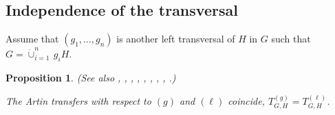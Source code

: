 \documentclass{amsart}
\newtheorem{proposition}{Proposition}[section]
\theoremstyle{definition}
\numberwithin{equation}{section}
\begin{document}
\subsection{Independence of the transversal}
\label{ss:Independence}

Assume that \((g_1,\ldots,g_n)\) is another left transversal of \(H\) in \(G\)
such that \(G=\dot{\cup}_{i=1}^n\,g_iH\).


\begin{proposition}
\label{prp:LeftLeft}
(See also
\cite[p.1014]{Su},
\cite[Thm.14.2.1, p.202]{Hl},
\cite[Hilfssatz 1.5, p.414]{Hp},
\cite[Thm.3.2, p.246]{Gs},
\cite[(37.1), p.198]{Ab},
\cite[Thm.(17.2), p.61]{DkHw},
\cite[p.154]{SmTb},
\cite[Thm.5.1, p.149]{Is},
\cite[Prop.2, p.2]{Ol}.)

The Artin transfers with respect to \((g)\) and \((\ell)\) coincide, \(T_{G,H}^{(g)}=T_{G,H}^{(\ell)}\).

\end{proposition}
\end{document}
